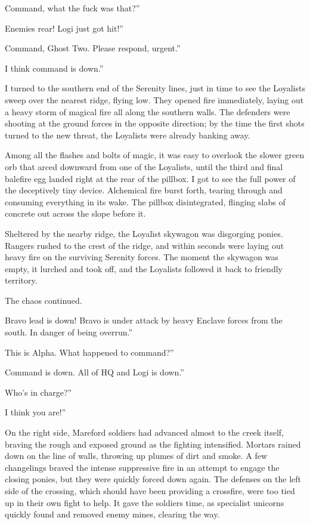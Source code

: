 \leavevmode{}Command, what the fuck was that?”

\leavevmode{}Enemies rear! Logi just got hit!”

\leavevmode{}Command, Ghost Two. Please respond, urgent.”

\leavevmode{}I think command is down.”

I turned to the southern end of the Serenity lines, just in time to see the Loyalists sweep over the nearest ridge, flying low. They opened fire immediately, laying out a heavy storm of magical fire all along the southern walls. The defenders were shooting at the ground forces in the opposite direction; by the time the first shots turned to the new threat, the Loyalists were already banking away.

Among all the flashes and bolts of magic, it was easy to overlook the slower green orb that arced downward from one of the Loyalists, until the third and final balefire egg landed right at the rear of the pillbox. I got to see the full power of the deceptively tiny device. Alchemical fire burst forth, tearing through and consuming everything in its wake. The pillbox disintegrated, flinging slabs of concrete out across the slope before it.

Sheltered by the nearby ridge, the Loyalist skywagon was disgorging ponies. Rangers rushed to the crest of the ridge, and within seconds were laying out heavy fire on the surviving Serenity forces. The moment the skywagon was empty, it lurched and took off, and the Loyalists followed it back to friendly territory.

The chaos continued.

\leavevmode{}Bravo lead is down! Bravo is under attack by heavy Enclave forces from the south. In danger of being overrun.”

\leavevmode{}This is Alpha. What happened to command?”

\leavevmode{}Command is down. All of HQ and Logi is down.”

\leavevmode{}Who’s in charge?”

\leavevmode{}I think you are!”

On the right side, Mareford soldiers had advanced almost to the creek itself, braving the rough and exposed ground as the fighting intensified. Mortars rained down on the line of walls, throwing up plumes of dirt and smoke. A few changelings braved the intense suppressive fire in an attempt to engage the closing ponies, but they were quickly forced down again. The defenses on the left side of the crossing, which should have been providing a crossfire, were too tied up in their own fight to help. It gave the soldiers time, as specialist unicorns quickly found and removed enemy mines, clearing the way.

